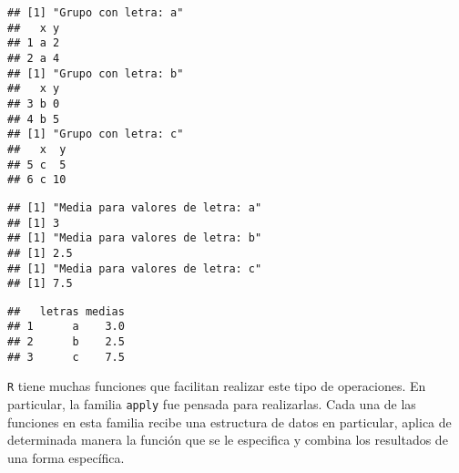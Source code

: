\documentclass[]{article}
\newenvironment{Shaded}{\begin{snugshade}}{\end{snugshade}}
\newcommand{\KeywordTok}[1]{\textcolor[rgb]{0.13,0.29,0.53}{\textbf{#1}}}
\newcommand{\DataTypeTok}[1]{\textcolor[rgb]{0.13,0.29,0.53}{#1}}
\newcommand{\StringTok}[1]{\textcolor[rgb]{0.31,0.60,0.02}{#1}}
\newcommand{\CommentTok}[1]{\textcolor[rgb]{0.56,0.35,0.01}{\textit{#1}}}
\newcommand{\ControlFlowTok}[1]{\textcolor[rgb]{0.13,0.29,0.53}{\textbf{#1}}}
\newcommand{\OperatorTok}[1]{\textcolor[rgb]{0.81,0.36,0.00}{\textbf{#1}}}
\newcommand{\NormalTok}[1]{#1}
\begin{document}
\begin{verbatim}
## [1] "Grupo con letra: a"
##   x y
## 1 a 2
## 2 a 4
## [1] "Grupo con letra: b"
##   x y
## 3 b 0
## 4 b 5
## [1] "Grupo con letra: c"
##   x  y
## 5 c  5
## 6 c 10
\end{verbatim}

\begin{Shaded}
\end{Shaded}

\begin{verbatim}
## [1] "Media para valores de letra: a"
## [1] 3
## [1] "Media para valores de letra: b"
## [1] 2.5
## [1] "Media para valores de letra: c"
## [1] 7.5
\end{verbatim}

\begin{Shaded}
\end{Shaded}

\begin{verbatim}
##   letras medias
## 1      a    3.0
## 2      b    2.5
## 3      c    7.5
\end{verbatim}

\texttt{R} tiene muchas funciones que facilitan realizar este tipo de
operaciones. En particular, la familia \texttt{apply} fue pensada para
realizarlas. Cada una de las funciones en esta familia recibe una
estructura de datos en particular, aplica de determinada manera la
función que se le especifica y combina los resultados de una forma
específica.
\end{document}
